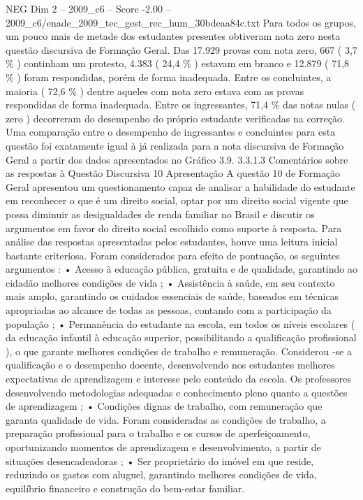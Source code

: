 \begin{textsample}{NEG Dim 2 – 2009\_c6 – Score -2.00 – 2009\_c6/enade\_2009\_tec\_gest\_rec\_hum\_30bdeaa84c.txt}
Para todos os grupos, um pouco mais de metade dos estudantes presentes obtiveram nota zero nesta questão discursiva de Formação Geral.
Das 17.929 provas com nota zero, 667 ( 3,7 \% ) continham um protesto, 4.383 ( 24,4 \% ) estavam em branco e 12.879 ( 71,8 \% ) foram respondidas, porém de forma inadequada.
Entre os concluintes, a maioria ( 72,6 \% ) dentre aqueles com nota zero estava com as provas respondidas de forma inadequada.
Entre os ingressantes, 71,4 \% das notas nulas ( zero ) decorreram do desempenho do próprio estudante verificadas na correção.
Uma comparação entre o desempenho de ingressantes e concluintes para esta questão foi exatamente igual à já realizada para a nota discursiva de Formação Geral a partir dos dados apresentados no Gráfico 3.9. 3.3.1.3 Comentários sobre as respostas à Questão Discursiva 10 Apresentação A questão 10 de Formação Geral apresentou um questionamento capaz de analisar a habilidade do estudante em reconhecer o que é um direito social, optar por um direito social vigente que possa diminuir as desigualdades de renda familiar no Brasil e discutir os argumentos em favor do direito social escolhido como suporte à resposta.
Para análise das respostas apresentadas pelos estudantes, houve uma leitura inicial bastante criteriosa.
Foram considerados para efeito de pontuação, os seguintes argumentos : • Acesso à educação pública, gratuita e de qualidade, garantindo ao cidadão melhores condições de vida ; • Assistência à saúde, em seu contexto mais amplo, garantindo os cuidados essenciais de saúde, baseados em técnicas apropriadas ao alcance de todas as pessoas, contando com a participação da população ; • Permanência do estudante na escola, em todos os níveis escolares ( da educação infantil à educação superior, possibilitando a qualificação profissional ), o que garante melhores condições de trabalho e remuneração.
Considerou -se a qualificação e o desempenho docente, desenvolvendo nos estudantes melhores expectativas de aprendizagem e interesse pelo conteúdo da escola.
Os professores desenvolvendo metodologias adequadas e conhecimento pleno quanto a questões de aprendizagem ; • Condições dignas de trabalho, com remuneração que garanta qualidade de vida.
Foram consideradas as condições de trabalho, a preparação profissional para o trabalho e os cursos de aperfeiçoamento, oportunizando momentos de aprendizagem e desenvolvimento, a partir de situações desencadeadoras ; • Ser proprietário do imóvel em que reside, reduzindo os gastos com aluguel, garantindo melhores condições de vida, equilíbrio financeiro e construção do bem-estar familiar.

\end{textsample}
